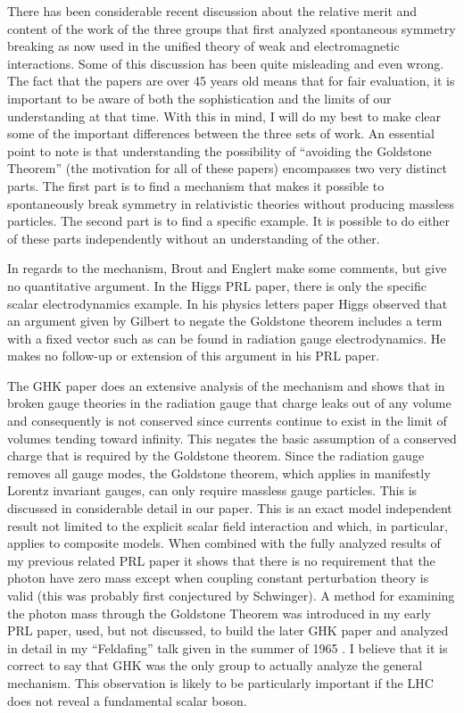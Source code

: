 \documentclass[letterpaper,twoside,preprintnumbers,slac_one]{revtex4}
\begin{document}
There has been considerable recent discussion about the relative merit
and content of the work of the three groups that first analyzed
spontaneous symmetry breaking as now used in the unified theory of
weak and electromagnetic interactions. Some of this discussion has
been quite misleading and even wrong. The fact that the papers are
over 45 years old means that for fair evaluation, it is important to
be aware of both the sophistication and the limits of our
understanding at that time. With this in mind, I will do my best to
make clear some of the important differences between the three sets of
work. An essential point to note is that understanding the
possibility of ``avoiding the Goldstone Theorem'' (the motivation for
all of these papers) encompasses two very distinct parts. The first
part is to find a mechanism that makes it possible to spontaneously
break symmetry in relativistic theories without producing massless
particles.  The second part is to find a specific example. It is
possible to do either of these parts independently without an
understanding of the other.

In regards to the mechanism, Brout and Englert make some comments, but
give no quantitative argument. In the Higgs PRL paper, there is only
the specific scalar electrodynamics example. In his physics letters
paper Higgs observed that an argument given by Gilbert to negate the
Goldstone theorem includes a term with a fixed vector such as can be
found in radiation gauge electrodynamics. He makes no follow-up or
extension of this argument in his PRL paper.

The GHK paper does an extensive analysis of the mechanism and shows
that in broken gauge theories in the radiation gauge that charge leaks
out of any volume and consequently is not conserved since currents
continue to exist in the limit of volumes tending toward infinity. This negates
the basic assumption of a conserved charge that is required by the
Goldstone theorem. Since the radiation gauge removes all gauge modes,
the Goldstone theorem, which applies in manifestly Lorentz invariant gauges, can only require massless
gauge particles. This is discussed in considerable detail in our
paper.  This is an exact model independent result not limited to the
explicit scalar field interaction and which, in particular, applies to
composite models. When combined with the fully analyzed results of my
previous related PRL paper it shows that there is no requirement that
the photon have zero mass except when coupling constant perturbation
theory is valid (this was probably first conjectured by Schwinger). A
method for examining the photon mass through the Goldstone Theorem was
introduced in my early PRL paper, used, but not discussed, to build the
later GHK paper and analyzed in detail in my ``Feldafing'' talk given
in the summer of 1965 \cite{hc;1965}. I believe that it is correct to say that GHK
was the only group to actually analyze the general mechanism. This observation is likely
to be particularly important if the LHC does not reveal a fundamental scalar boson.
\end{document}

